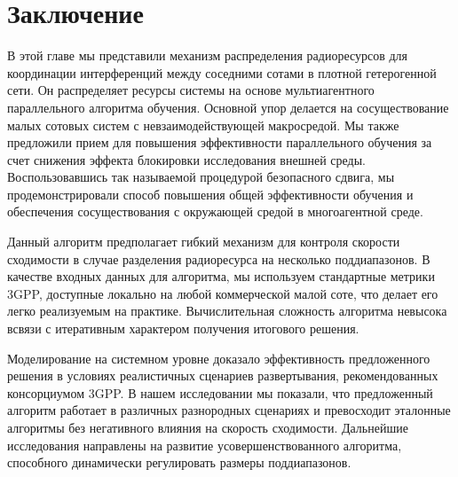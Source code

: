 \section{Заключение}
В этой главе мы представили механизм распределения радиоресурсов для координации интерференций между соседними сотами в плотной гетерогенной сети. Он распределяет ресурсы системы на основе мультиагентного параллельного алгоритма обучения. Основной упор делается на сосуществование малых сотовых систем с невзаимодействующей макросредой. Мы также предложили прием для повышения эффективности параллельного обучения за счет снижения эффекта блокировки исследования внешней среды. Воспользовавшись так называемой процедурой безопасного сдвига, мы продемонстрировали способ повышения общей эффективности обучения и обеспечения сосуществования с окружающей средой в многоагентной среде.

Данный алгоритм предполагает гибкий механизм для контроля скорости сходимости в случае разделения радиоресурса на несколько поддиапазонов. В качестве входных данных для алгоритма, мы используем стандартные метрики 3GPP, доступные локально на любой коммерческой малой соте, что делает его легко реализуемым на практике. Вычислительная сложность алгоритма невысока всвязи с итеративным характером получения итогового решения.

Моделирование на системном уровне доказало эффективность предложенного решения в условиях реалистичных сценариев развертывания, рекомендованных консорциумом 3GPP. В нашем исследовании мы показали, что предложенный алгоритм работает в различных разнородных сценариях и превосходит эталонные алгоритмы без негативного влияния на скорость сходимости. Дальнейшие исследования направлены на развитие усовершенствованного алгоритма, способного динамически регулировать размеры поддиапазонов.
